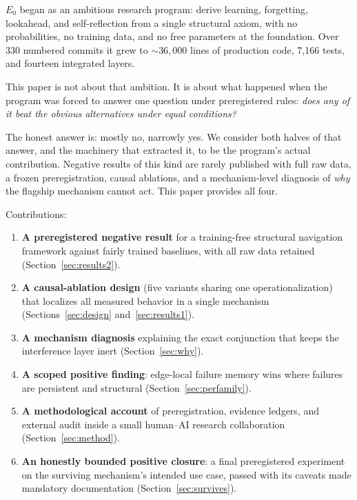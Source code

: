 \documentclass[11pt]{article}
\newcommand{\Ez}{$E_0$}
\begin{document}
\Ez{} began as an ambitious research program: derive learning, forgetting,
lookahead, and self-reflection from a single structural axiom, with no
probabilities, no training data, and no free parameters at the foundation.
Over 330 numbered commits it grew to ${\sim}36{,}000$ lines of production
code, 7{,}166 tests, and fourteen integrated layers.

This paper is not about that ambition. It is about what happened when the
program was forced to answer one question under preregistered rules:
\emph{does any of it beat the obvious alternatives under equal conditions?}

The honest answer is: mostly no, narrowly yes. We consider both halves of
that answer, and the machinery that extracted it, to be the program's actual
contribution. Negative results of this kind are rarely published with full
raw data, a frozen preregistration, causal ablations, and a mechanism-level
diagnosis of \emph{why} the flagship mechanism cannot act. This paper
provides all four.

Contributions:
\begin{enumerate}
  \item \textbf{A preregistered negative result} for a training-free
    structural navigation framework against fairly trained baselines, with
    all raw data retained (Section~\ref{sec:results2}).
  \item \textbf{A causal-ablation design} (five variants sharing one
    operationalization) that localizes all measured behavior in a single
    mechanism (Sections~\ref{sec:design} and~\ref{sec:results1}).
  \item \textbf{A mechanism diagnosis} explaining the exact conjunction that
    keeps the interference layer inert (Section~\ref{sec:why}).
  \item \textbf{A scoped positive finding}: edge-local failure memory wins
    where failures are persistent and structural
    (Section~\ref{sec:perfamily}).
  \item \textbf{A methodological account} of preregistration, evidence
    ledgers, and external audit inside a small human--AI research
    collaboration (Section~\ref{sec:method}).
  \item \textbf{An honestly bounded positive closure}: a final preregistered
    experiment on the surviving mechanism's intended use case, passed with
    its caveats made mandatory documentation (Section~\ref{sec:survives}).
\end{enumerate}
\end{document}

